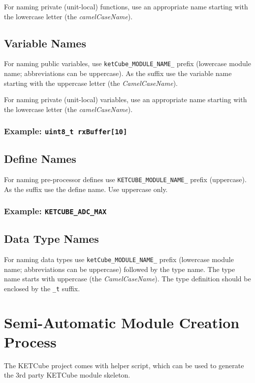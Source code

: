 For naming private (unit-local) functions, use an appropriate name starting with the lowercase letter (the {\it camelCaseName}).

\subsection*{Variable Names}
For naming public variables, use {\tt ketCube\_MODULE\_NAME\_} prefix (lowercase module name; abbreviations can be uppercase). As the suffix use the variable name starting with the uppercase letter (the {\it CamelCaseName}).

For naming private (unit-local) variables, use an appropriate name starting with the lowercase letter (the {\it camelCaseName}).
\subsubsection*{Example: {\tt uint8\_t rxBuffer[10]}}

\subsection*{Define Names}
For naming pre-processor defines use {\tt KETCUBE\_MODULE\_NAME\_} prefix (uppercase). As the suffix use the define name. Use uppercase only.
\subsubsection*{Example: {\tt KETCUBE\_ADC\_MAX}}

\clearpage
\subsection*{Data Type Names}
For naming data types use {\tt ketCube\_MODULE\_NAME\_} prefix (lowercase module name; abbreviations can be uppercase) followed by the type name. The type name starts with uppercase (the {\it CamelCaseName}). The type definition should be enclosed by the {\tt \_t} suffix.

\clearpage
\section{Semi-Automatic Module Creation Process}
The KETCube project comes with helper script, which can be used to generate the 3rd party KETCube module skeleton. 

